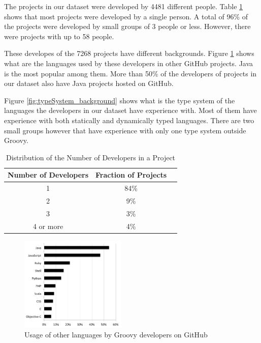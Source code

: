 \documentclass[preprint]{sigplanconf}
\begin{document}

The projects in our dataset were developed by 4481 different people. 
Table \ref{tab:number_of_developers} shows that most projects were developed by a single person.
A total of 96\% of the projects were developed by small groups of 3 people or less.
However, there were projects with up to 58 people.

These developes of the 7268 projects have different backgrounds.
Figure \ref{fig:other_languages} shows what are the languages used by these developers in other GitHub projects. 
Java is the most popular among them.
More than 50\% of the developers of projects in our dataset also have Java projects hosted on GitHub.

Figure \ref{fig:typeSystem_background} shows what is the type system of the languages the developers in our dataset have experience with.
Most of them have experience with both statically and dynamically typed languages.
There are two small groups however that have experience with only one type system outside Groovy.
 
\begin{table}[ht]
\caption{Distribution of the Number of Developers in a Project}
\centering{}%
\begin{tabular}{|c|c|c|}
\hline 
Number of Developers & Fraction of Projects\tabularnewline
\hline 
\hline 
1 & 84\%\tabularnewline
\hline 
2 & 9\%\tabularnewline
\hline 
3 & 3\%\tabularnewline
\hline 
4 or more & 4\%\tabularnewline
\hline 
\end{tabular}
\label{tab:number_of_developers}
\end{table}

\begin{figure}[ht]
\centering \includegraphics[width=0.45\textwidth]{other_languages}
\caption{Usage of other languages by Groovy developers on GitHub}
\label{fig:other_languages} 
\end{figure}
\end{document}
